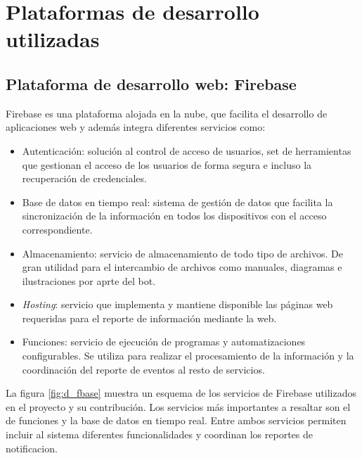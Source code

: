 \section{Plataformas de desarrollo utilizadas}

\subsection{Plataforma de desarrollo web: Firebase}
Firebase es una plataforma alojada en la nube, que facilita el desarrollo de aplicaciones web y además integra diferentes servicios como:
\begin{itemize}
\item Autenticación: solución al control de acceso de usuarios, set de herramientas que gestionan el acceso de los usuarios de forma segura e incluso la recuperación de credenciales.
\item Base de datos en tiempo real: sistema de gestión de datos que facilita la sincronización de la información en todos los dispositivos con el acceso correspondiente.
\item Almacenamiento: servicio de almacenamiento de todo tipo de archivos. De gran utilidad para el intercambio de archivos como manuales, diagramas e ilustraciones por aprte del bot.
\item \textit{Hosting}: servicio que implementa y mantiene disponible las páginas web requeridas para el reporte de información mediante la web.
\item Funciones: servicio de ejecución de programas y automatizaciones configurables. Se utiliza para realizar el procesamiento de la información y la coordinación del reporte de eventos al resto de servicios.
\end{itemize}

La figura \ref{fig:d_fbase} muestra un esquema de los servicios de Firebase utilizados en el proyecto y su contribución. Los servicios más importantes a resaltar son el de funciones y la base de datos en tiempo real. Entre ambos servicios permiten incluir al sistema diferentes funcionalidades y coordinan los reportes de notificacion.


